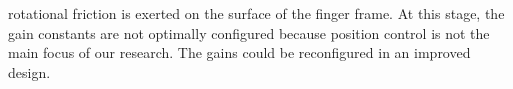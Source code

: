 \documentclass{llncs}
\begin{document}
rotational friction
is exerted on the surface of the finger frame.
At this stage, the gain constants are not optimally configured because position control is not the main focus of our research.
The gains could be reconfigured in an improved design.

		


\end{document}
